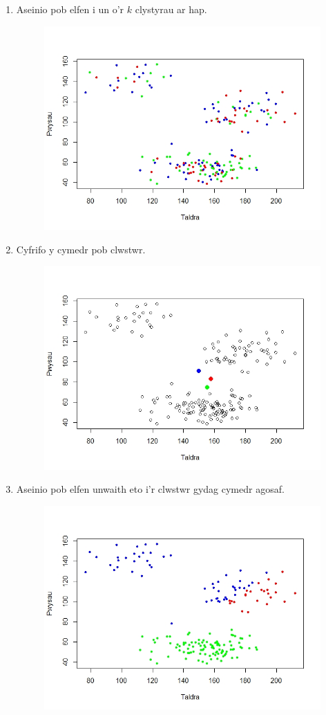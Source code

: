 \begin{enumerate}
\item Aseinio pob elfen i un o'r $k$ clystyrau ar hap.

\begin{figure}[h]
\begin{center}
\includegraphics[width=0.5\linewidth]{../img/Cam1.jpeg}
\end{center}
\end{figure}

\item Cyfrifo y cymedr pob clwstwr.

\begin{figure}[h]
\begin{center}
\includegraphics[width=0.5\linewidth]{../img/ClystyrauCychwynol.jpeg}
\end{center}
\end{figure}

\item Aseinio pob elfen unwaith eto i'r clwstwr gydag cymedr agosaf.

\begin{figure}[h]
\begin{center}
\includegraphics[width=0.5\linewidth]{../img/Cam3.jpeg}
\end{center}
\end{figure}


\end{enumerate}
